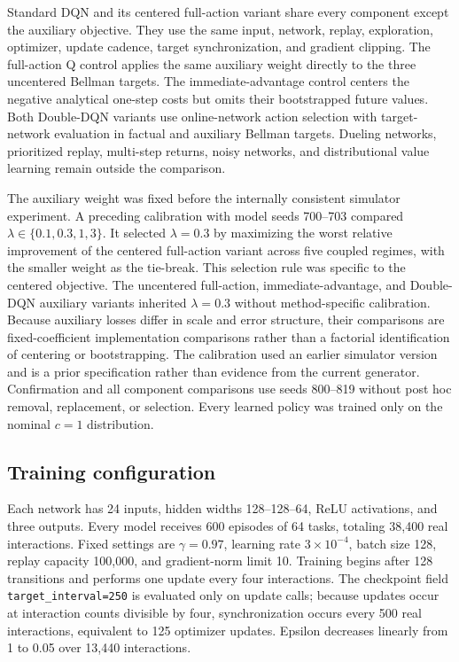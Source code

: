 \documentclass[11pt]{article}
\begin{document}
Standard DQN and its centered full-action variant share every component except the auxiliary objective. They use the same input, network, replay, exploration, optimizer, update cadence, target synchronization, and gradient clipping. The full-action Q control applies the same auxiliary weight directly to the three uncentered Bellman targets. The immediate-advantage control centers the negative analytical one-step costs but omits their bootstrapped future values. Both Double-DQN variants use online-network action selection with target-network evaluation in factual and auxiliary Bellman targets. Dueling networks, prioritized replay, multi-step returns, noisy networks, and distributional value learning remain outside the comparison.

The auxiliary weight was fixed before the internally consistent simulator experiment. A preceding calibration with model seeds 700--703 compared $\lambda\in\{0.1,0.3,1,3\}$. It selected $\lambda=0.3$ by maximizing the worst relative improvement of the centered full-action variant across five coupled regimes, with the smaller weight as the tie-break. This selection rule was specific to the centered objective. The uncentered full-action, immediate-advantage, and Double-DQN auxiliary variants inherited $\lambda=0.3$ without method-specific calibration. Because auxiliary losses differ in scale and error structure, their comparisons are fixed-coefficient implementation comparisons rather than a factorial identification of centering or bootstrapping. The calibration used an earlier simulator version and is a prior specification rather than evidence from the current generator. Confirmation and all component comparisons use seeds 800--819 without post hoc removal, replacement, or selection. Every learned policy was trained only on the nominal $c=1$ distribution.

\subsection{Training configuration}

Each network has 24 inputs, hidden widths 128--128--64, ReLU activations, and three outputs. Every model receives 600 episodes of 64 tasks, totaling 38,400 real interactions. Fixed settings are $\gamma=0.97$, learning rate $3\times10^{-4}$, batch size 128, replay capacity 100,000, and gradient-norm limit 10. Training begins after 128 transitions and performs one update every four interactions. The checkpoint field \texttt{target\_interval=250} is evaluated only on update calls; because updates occur at interaction counts divisible by four, synchronization occurs every 500 real interactions, equivalent to 125 optimizer updates. Epsilon decreases linearly from 1 to 0.05 over 13,440 interactions.
\end{document}
